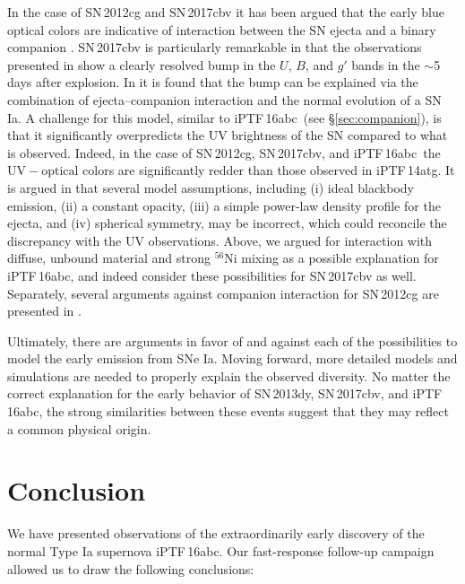 \documentclass[twocolumn]{aastex61}
\newcommand{\abc}{iPTF\,16abc}
\begin{document}
In the case of SN\,2012cg and SN\,2017cbv it has been argued that the early
blue optical colors are indicative of interaction between the SN ejecta and
a binary companion \citep{2016ApJ...820...92M,2017ApJ...845L..11H}.
SN\,2017cbv is particularly remarkable in that the observations presented in
\citet{2017ApJ...845L..11H} show a clearly resolved bump in the $U$, $B$,
and $g'$ bands in the $\sim$5\,days after explosion. In
\citeauthor{2017ApJ...845L..11H} it is found that the bump can be explained
via the combination of ejecta--companion interaction and the normal
evolution of a SN Ia. A challenge for this model, similar to \abc\ (see
\S\ref{sec:companion}), is that it significantly overpredicts the UV
brightness of the SN compared to what is observed. Indeed, in the case of
SN\,2012cg, SN\,2017cbv, and \abc\ the $\mathrm{UV} - \mathrm{optical}$
colors are significantly redder than those observed in iPTF\,14atg. It is
argued in \citet{2017ApJ...845L..11H} that several model assumptions,
including (i) ideal blackbody emission, (ii) a constant opacity, (iii) a
simple power-law density profile for the ejecta, and (iv) spherical
symmetry, may be incorrect, which could reconcile the discrepancy with the
UV observations. Above, we argued for interaction with diffuse, unbound
material and strong $^{56}$Ni mixing as a possible explanation for \abc, and
indeed \citet{2017ApJ...845L..11H} consider these possibilities for
SN\,2017cbv as well. Separately, several arguments against companion
interaction for SN\,2012cg are presented in \citet{2016arXiv161007601S}.

Ultimately, there are arguments in favor of and against each of the
possibilities to model the early emission from SNe Ia. Moving forward, more
detailed models and simulations are needed to properly explain the observed
diversity. No matter the correct explanation for the early behavior of
SN\,2013dy, SN\,2017cbv, and \abc, the strong similarities between these
events suggest that they may reflect a common physical origin.

\section{Conclusion}
\label{sec:conclusion}

We have presented observations of the extraordinarily early discovery of the 
normal Type Ia supernova \abc. Our fast-response follow-up 
campaign allowed us to draw the following conclusions:
\end{document}

